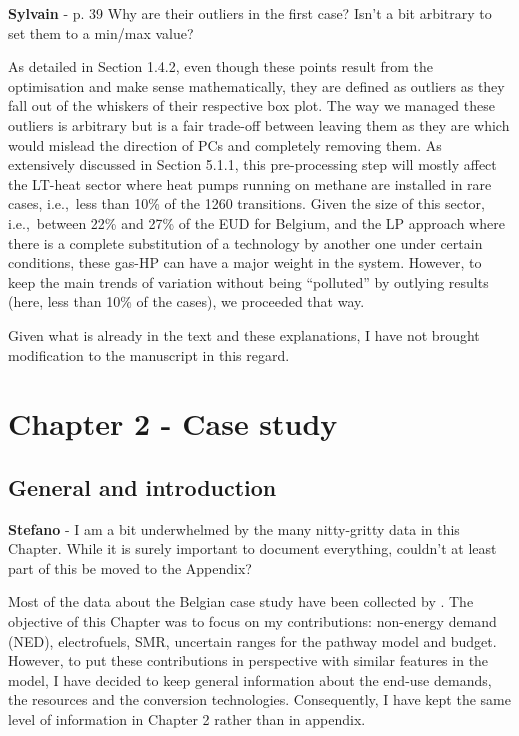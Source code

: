 \documentclass[12pt,a4paper]{article}
\def\ie{i.e.,\ }
\begin{document}
\begin{mdframed}[style=comment] %
{\color{purple} \textbf{Sylvain}} - p. 39 Why are their outliers in the first case? Isn't a bit arbitrary to set them to a min/max value?
\end{mdframed}

\noindent As detailed in Section 1.4.2, even though these points result from the optimisation and make sense mathematically, they are defined as outliers as they fall out of the whiskers of their respective box plot. The way we managed these outliers is arbitrary but is a fair trade-off between leaving them as they are which would mislead the direction of PCs and completely removing them. As extensively discussed in Section 5.1.1, this pre-processing step will mostly affect the LT-heat sector where heat pumps running on methane are installed in rare cases, \ie less than 10\% of the 1260 transitions. Given the size of this sector, \ie between 22\% and 27\% of the EUD for Belgium, and the LP approach where there is a complete substitution of a technology by another one under certain conditions, these gas-HP can have a major weight in the system. However, to keep the main trends of variation without being ``polluted'' by outlying results (here, less than 10\% of the cases), we proceeded that way.

Given what is already in the text and these explanations, I have not brought modification to the manuscript in this regard.

\section{Chapter 2 - Case study}
\label{case_study}

\subsection{General and introduction}
\label{methodo_general}

\begin{mdframed}[style=comment] %
{\color{orange} \textbf{Stefano}} - I am a bit underwhelmed by the many nitty-gritty data in this Chapter. While it is surely important to document everything, couldn’t at least part of this be moved to the Appendix?
\end{mdframed}

\noindent Most of the data about the Belgian case study have been collected by \citet{limpens2021generating}. The objective of this Chapter was to focus on my contributions: non-energy demand (NED), electrofuels, SMR, uncertain ranges for the pathway model and  budget. However, to put these contributions in perspective with similar features in the model, I have decided to keep general information about the end-use demands, the resources and the conversion technologies. Consequently, I have kept the same level of information in Chapter 2 rather than in appendix.
\end{document}
